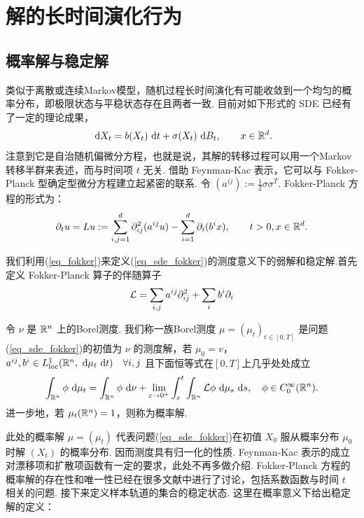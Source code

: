 \chapter{解的长时间演化行为}\label{chap4}

\section{概率解与稳定解}

类似于离散或连续Markov模型，随机过程长时间演化有可能收敛到一个均匀的概率分布，即极限状态与平稳状态存在且两者一致. 目前对如下形式的 SDE 已经有了一定的理论成果，
\begin{equation}\label{eq_sde_fokker}
	\text{ d} X_t = b(X_t) \text{ d} t + \sigma(X_t) \text{ d} B_t,\qquad  x\in \mathbb{R}^d. 
\end{equation}
注意到它是自治随机偏微分方程，也就是说，其解的转移过程可以用一个Markov转移半群来表述\cite{semi_group_1,semi_group_2}，而与时间项 $t$ 无关. 
借助 Feynman-Kac 表示，它可以与 Fokker-Planck 型确定型微分方程建立起紧密的联系. 令 $(a^{ij}) := \frac12 \sigma\sigma^T$. Fokker-Planck 方程的形式为：
\begin{equation}\label{eq_fokker}
	\partial_t u = Lu := \sum_{i,j=1}^d \partial^2_{ij} (a^{ij}u) - \sum_{i=1}^d \partial_i (b^ix),\qquad
	t>0,x \in \mathbb{R}^d.
\end{equation}

我们利用(\ref{eq_fokker})来定义(\ref{eq_sde_fokker})的测度意义下的弱解和稳定解.首先定义 Fokker-Planck 算子的伴随算子
\begin{equation}\label{eq4.3}
	\mathcal{L} = \sum_{i,j}a^{ij} \partial_{ij}^2  + \sum_i b^i \partial_i
\end{equation}

\begin{definition}[测度解]
	令 $\nu$ 是 $\mathbb{R}^n$ 上的Borel测度. 我们称一族Borel测度 $\mu = (\mu_t)_{t\in [0,T]}$ 是问题(\ref{eq_sde_fokker})的初值为 $\nu$ 的测度解，若 $\mu_0=v$，$a^{ij},b^i \in L^1_{\mathrm{loc}}(\mathbb{R}^n,\text{ d} \mu_t \text{ d} t) \quad \forall i,j $ 且下面恒等式在$[0,T]$上几乎处处成立
	\[
	\int_{\mathbb{R}^n} \phi \text{ d} \mu_{t}=\int_{\mathbb{R}^n} \phi \text{ d} \nu + \lim _{\varepsilon \to 0^{+}} \int_{\varepsilon}^t \int_{\mathbb{R}^n} \mathcal{L} \phi \text{ d} \mu_s \text{ d} s,\quad \phi \in C_{0}^{\infty}(\mathbb{R}^n) .
	\]	
	进一步地，若 $\mu_t(\mathbb{R}^n) = 1$，则称为概率解. 
\end{definition}

此处的概率解 $\mu=(\mu_t)$ 代表问题(\ref{eq_sde_fokker})在初值 $X_0$ 服从概率分布 $\mu_0$ 时解 $(X_t)$ 的概率分布. 因而测度具有归一化的性质. Feynman-Kac 表示的成立对漂移项和扩散项函数有一定的要求，此处不再多做介绍. 
Fokker-Planck 方程的概率解的存在性和唯一性已经在很多文献中进行了讨论\cite{zongshu2-24,zongshu2-26}，包括系数函数与时间 $t$ 相关的问题. 
接下来定义样本轨道的集合的稳定状态. 这里在概率意义下给出稳定解的定义：






